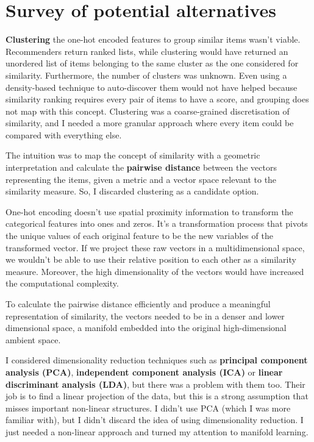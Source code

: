 
\section{Survey of potential alternatives}

\textbf{Clustering} the one-hot encoded features to group similar items wasn't viable.
Recommenders return ranked lists, while clustering would have returned an unordered list of items
belonging to the same cluster as the one considered for similarity.
Furthermore, the number of clusters was unknown.
Even using a density-based technique to auto-discover them would not have helped
because similarity ranking requires every pair of items to have a score,
and grouping does not map with this concept.
Clustering was a coarse-grained discretisation of similarity,
and I needed a more granular approach where every item could be compared with everything else.

The intuition was to map the concept of similarity with a geometric interpretation
and calculate the \textbf{pairwise distance} between the vectors representing the items,
given a metric and a vector space relevant to the similarity measure.
So, I discarded clustering as a candidate option.

One-hot encoding doesn't use spatial proximity information to transform the categorical features into ones and zeros.
It's a transformation process that pivots the unique values of each original feature to be the new variables of the transformed vector.
If we project these raw vectors in a multidimensional space, we wouldn't be able to use their
relative position to each other as a similarity measure. Moreover, the high dimensionality of the vectors would have increased
the computational complexity.

To calculate the pairwise distance efficiently and produce a meaningful representation of similarity,
the vectors needed to be in a denser and lower dimensional space,
a manifold embedded into the original high-dimensional ambient space.

I considered dimensionality reduction techniques such as \textbf{principal component analysis (PCA)},
\textbf{independent component analysis (ICA)} or \textbf{linear discriminant analysis (LDA)},
but there was a problem with them too.
Their job is to find a linear projection of the data,
but this is a strong assumption that misses important non-linear structures.
I didn't use PCA (which I was more familiar with),
but I didn't discard the idea of using dimensionality reduction.
I just needed a non-linear approach and turned my attention to manifold learning.


